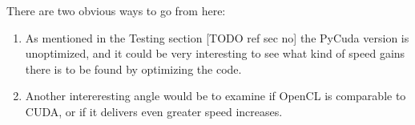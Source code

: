 There are two obvious ways to go from here:

\begin{enumerate}
\item As mentioned in the Testing section [TODO ref sec no] the PyCuda version is unoptimized, and it could be very interesting to see what kind of speed gains there is to be found by optimizing the code.
\item Another intereresting angle would be to examine if OpenCL is comparable to CUDA, or if it delivers even greater speed increases.
\end{enumerate}

\newpage


\newpage





